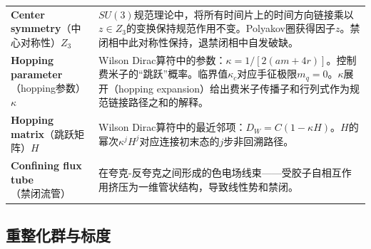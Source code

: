 \documentclass[12pt,a4paper]{ctexart}
\begin{document}
\begin{longtable}{p{3.5cm}p{9cm}}
\textbf{Center symmetry}（中心对称性）$Z_3$& $SU(3)$规范理论中，将所有时间片上的时间方向链接乘以$z\in Z_3$的变换保持规范作用不变。Polyakov圈获得因子$z$。禁闭相中此对称性保持，退禁闭相中自发破缺。\\
\textbf{Hopping parameter}（hopping参数）$\kappa$& Wilson Dirac算符中的参数：$\kappa = 1/[2(am+4r)]$。控制费米子的``跳跃''概率。临界值$\kappa_c$对应手征极限$m_q=0$。$\kappa$展开（hopping expansion）给出费米子传播子和行列式作为规范链接路径之和的解释。\\
\textbf{Hopping matrix}（跳跃矩阵）$H$& Wilson Dirac算符中的最近邻项：$D_W = C(1-\kappa H)$。$H$的幂次$\kappa^j H^j$对应连接初末态的$j$步非回溯路径。\\
\textbf{Confining flux tube}（禁闭流管）& 在夸克-反夸克之间形成的色电场线束——受胶子自相互作用挤压为一维管状结构，导致线性势和禁闭。\\
\bottomrule
\end{longtable}

\subsection*{重整化群与标度}
\end{document}
